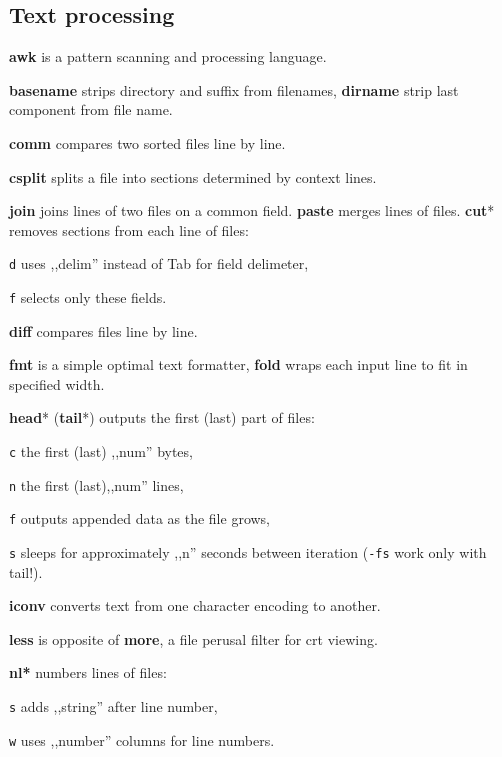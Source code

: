 \subsection{Text processing}

\textbf{awk} is a pattern scanning and processing language.


\textbf{basename} strips directory and suffix from filenames, 
\textbf{dirname} strip last component from file name.

\textbf{comm} compares two sorted files line by line.

\textbf{csplit} splits a file into sections determined by context lines.

\textbf{join} joins lines of two files on a common field.
\textbf{paste} merges lines of files.
\textbf{cut}* removes sections from each line of files:
\begin{enumx}
	\item [\texttt{d}] uses ,,delim'' instead of Tab for field delimeter,
	\item [\texttt{f}] selects only these fields.
\end{enumx}

\textbf{diff} compares files line by line.


\textbf{fmt} is a simple optimal text formatter, 
\textbf{fold} wraps each input line to fit in specified width.

\textbf{head}* (\textbf{tail}*) outputs the first (last) part of files:
\begin{enumx}
	\item [\texttt{c}] the first (last) ,,num'' bytes,
	\item [\texttt{n}] the first (last),,num'' lines,
	\item [\texttt{f}] outputs appended data as the file grows,
	\item [\texttt{s}] sleeps for approximately ,,n'' seconds between iteration 
	                   (\texttt{-fs} work only with tail!).
\end{enumx}

\textbf{iconv} converts text from one character encoding to another.

\textbf{less} is opposite of \textbf{more}, a file perusal filter for crt viewing.

\textbf{nl*} numbers lines of files:
\begin{enumx}
	\item [\texttt{s}] adds ,,string'' after line number,
	\item [\texttt{w}] uses ,,number'' columns for line numbers.
\end{enumx}


